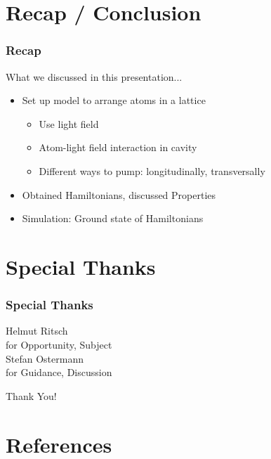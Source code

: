 \documentclass[pdflatex,compress]{beamer}
\begin{document}
\section{Recap / Conclusion}

\begin{frame}
\frametitle{Recap}
What we discussed in this presentation...
\begin{itemize}
	\item Set up model to arrange atoms in a lattice
	\begin{itemize}
		\item Use light field
		\item Atom-light field interaction in cavity
		\item Different ways to pump: longitudinally, transversally
	\end{itemize}
	\item Obtained Hamiltonians, discussed Properties
	\item Simulation: Ground state of Hamiltonians
\end{itemize}
\end{frame}

\section{Special Thanks}

\begin{frame}
\frametitle{Special Thanks}
\begin{center}
\huge Helmut Ritsch \\
\small for Opportunity, Subject \\
\vspace{2em}
\huge Stefan Ostermann \\
\small for Guidance, Discussion
\end{center}
\end{frame}

\begin{frame}
\begin{center}
\huge Thank You!
\end{center}
\end{frame}

\section{References}

\begin{frame}[allowframebreaks]


\end{frame}
\end{document}
